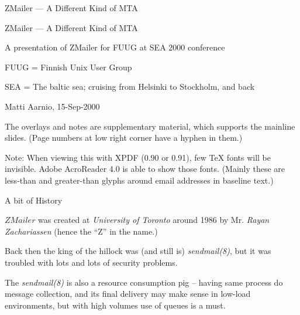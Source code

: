 \documentclass[a4paper,landscape]{slides}
\newcommand{\ZM}{ZMailer}
\begin{document}
\pagestyle{plain}


\begin{slide}

\begin{center}
 ZMailer --- A Different Kind of MTA
\end{center}

\vfill

\begin{center}
\end{center}

\vfill

\end{slide}


\begin{overlay}

\begin{center}
 ZMailer --- A Different Kind of MTA
\end{center}

\vfill

  A presentation of ZMailer for  FUUG at SEA 2000 conference

     FUUG = Finnish Unix User Group

     SEA  = The baltic sea; cruising from Helsinki to Stockholm, and back

 Matti Aarnio, 15-Sep-2000

The overlays and notes are supplementary material, which supports
the mainline slides.
(Page numbers at low right corner have a hyphen in them.)

\small
Note: When viewing this with XPDF (0.90 or 0.91), few \TeX{}
fonts will be invisible.
Adobe AcroReader 4.0 is able to show those fonts.
(Mainly these are less-than and greater-than glyphs around email
 addresses in baseline text.)

\end{overlay}



\begin{slide}
\centerline{\large A bit of History}

$\ZM$ was created at {\em University of Toronto} around 1986 by
Mr. {\em Rayan Zachariassen} (hence the ``Z'' in the name.)

Back then the king of the hillock was (and still is) {\em sendmail(8)},
but it was troubled with lots and lots of security problems.

The {\em sendmail(8)} is also a resource consumption pig -- having same
process do message collection, and its final delivery may make sense
in low-load environments, but with high volumes use of queues is a must.

\vfill

\end{slide}
\end{document}

